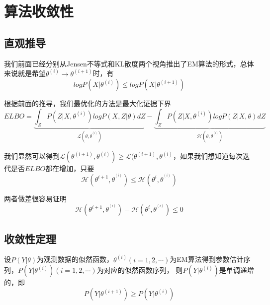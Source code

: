\chapter{算法收敛性}

\section{直观推导}
我们前面已经分别从Jensen不等式和KL散度两个视角推出了EM算法的形式，总体来说就是希望$\theta^{(i)}\rightarrow \theta^{(i+1)}$时，有
\begin{equation}
    logP(X|\theta^{(i)})\leqslant logP(X|\theta^{(i+1)})
\end{equation}

根据前面的推导，我们最优化的方法是最大化证据下界
\begin{equation}
    ELBO=\underbrace{\int_{Z}P(Z|X,\theta^{(i)})logP(X,Z|\theta)dZ}_{\mathcal{L}(\theta,\theta^{^{(i)}})}-\underbrace{\int_{Z}P(Z|X,\theta^{(i)})logP(Z|X,\theta)dZ}_{\mathcal{H}(\theta,\theta^{^{(i)}})}
\end{equation}

我们显然可以得到$\mathcal{L}(\theta^{(i+1)},\theta^{(i)})\geqslant \mathcal{L}(\theta^{(i+1)},\theta^{(i)}$，如果我们想知道每次迭代是否$ELBO$都在增加，只要
\begin{equation}
    \mathcal{H}(\theta^{i+1},\theta^{^{(i)}})\leqslant\mathcal{H}(\theta^{i},\theta^{^{(i)}})
\end{equation}

两者做差很容易证明
\begin{equation}
    \mathcal{H}(\theta^{i+1},\theta^{^{(i)}})-\mathcal{H}(\theta^{i},\theta^{^{(i)}})\leqslant 0
\end{equation}

\section{收敛性定理}

\begin{framed}
    \begin{theorem}
        设$P(Y|\theta)$为观测数据的似然函数，$\theta^{(i)}(i=1,2,\cdots)$为EM算法得到参数估计序列，$P(Y|\theta^{(i)})(i=1,2,\cdots)$为对应的似然函数序列，
        则$P(Y|\theta^{(i)})$是单调递增的，即
        \begin{equation}
            P(Y|\theta^{(i+1)})\geqslant P(Y|\theta^{(i)})
        \end{equation}
    \end{theorem}
\end{framed}

